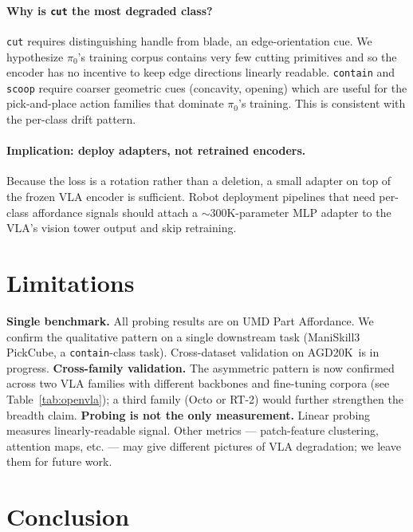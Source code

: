 \documentclass[10pt]{article}
\begin{document}
\paragraph{Why is \texttt{cut} the most degraded class?} \texttt{cut}
requires distinguishing handle from blade, an edge-orientation cue. We
hypothesize $\pi_0$'s training corpus contains very few cutting primitives
and so the encoder has no incentive to keep edge directions linearly
readable. \texttt{contain} and \texttt{scoop} require coarser geometric
cues (concavity, opening) which are useful for the pick-and-place action
families that dominate $\pi_0$'s training. This is consistent with the
per-class drift pattern.

\paragraph{Implication: deploy adapters, not retrained encoders.} Because the
loss is a rotation rather than a deletion, a small adapter on top of the
frozen VLA encoder is sufficient. Robot deployment pipelines that need
per-class affordance signals should attach a $\sim 300$K-parameter MLP
adapter to the VLA's vision tower output and skip retraining.

\section{Limitations}

\textbf{Single benchmark.} All probing results are on UMD Part Affordance.
We confirm the qualitative pattern on a single downstream task (ManiSkill3
PickCube, a \texttt{contain}-class task). Cross-dataset validation on
AGD20K\,\cite{luo2022agd20k} is in progress. \textbf{Cross-family validation.} The asymmetric pattern is now confirmed
across two VLA families with different backbones and fine-tuning corpora
(see Table~\ref{tab:openvla}); a third family (Octo or RT-2) would further
strengthen the breadth claim.
\textbf{Probing is not the only measurement.} Linear probing measures
linearly-readable signal. Other metrics — patch-feature clustering, attention
maps, etc. — may give different pictures of VLA degradation; we leave them
for future work.

\section{Conclusion}
\end{document}
